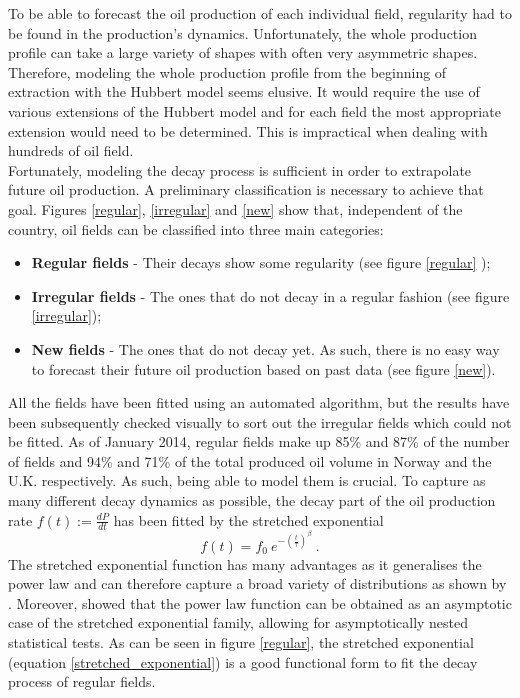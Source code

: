 \documentclass[review]{elsarticle}
\begin{document}
To be able to forecast the oil production of each individual field,
regularity had to be found in the production's dynamics. Unfortunately, the whole production profile can take a large variety of shapes with often very asymmetric shapes. Therefore, modeling the whole production profile from the beginning of extraction with the Hubbert model seems elusive. It would require the use of various extensions of the Hubbert model and for each field the most appropriate extension would need to be determined. This is impractical when dealing with hundreds of oil field.\\
Fortunately, modeling the decay process is sufficient in order to extrapolate future oil production. A preliminary classification is necessary to achieve that goal. Figures \ref{regular}, \ref{irregular} and \ref{new} show that, independent of the country, oil fields can be classified into three main categories:
\begin{itemize}
\item \textbf{Regular fields} - Their decays show some regularity (see figure \ref{regular} ); 
\item \textbf{Irregular fields} - The ones that do not decay in a regular
fashion (see figure \ref{irregular});
\item \textbf{New fields} - The ones that do not decay yet. As such, there
is no easy way to forecast their future oil production based on past
data (see figure \ref{new}).
\end{itemize}
\noindent All the fields have been fitted using an automated algorithm,
but the results have been subsequently checked visually to sort out
the irregular fields which could not be fitted. As of January 2014,
regular fields make up 85\% and 87\% of the number of fields and 94\%
and 71\% of the total produced oil volume in Norway and the U.K. respectively.
As such, being able to model them is crucial. To capture as many different
decay dynamics as possible, the decay part of the oil production rate
$f(t) := \frac{dP}{dt}$ has been fitted by the stretched exponential  
\begin{equation}
f(t)=f_{0}~e^{-\left(\frac{t}{\tau}\right)^{\beta}}~.
\label{stretched_exponential}
\end{equation}
The stretched exponential function
has many advantages as it generalises the power law and can therefore
capture a broad variety of distributions as shown by \citet{Laherrere1998}. Moreover,
\citet{Malevergne2005} showed that the power law
function can be obtained as an asymptotic case of the stretched
exponential family, allowing for asymptotically nested statistical tests.  As can be seen
in figure \ref{regular}, the stretched exponential (equation \ref{stretched_exponential})
is a good functional form to fit the decay process of regular fields.
\end{document}
